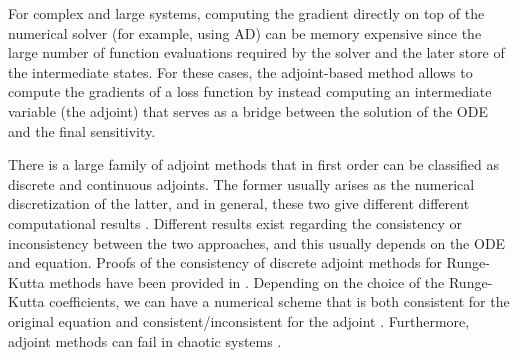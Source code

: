 
For complex and large systems, computing the gradient directly on top of the numerical solver (for example, using AD) can be memory expensive since the large number of function evaluations required by the solver and the later store of the intermediate states. 
For these cases, the adjoint-based method allows to compute the gradients of a loss function by instead computing an intermediate variable (the adjoint) that serves as a bridge between the solution of the ODE and the final sensitivity. 

There is a large family of adjoint methods that in first order can be classified as discrete and continuous adjoints. 
The former usually arises as the numerical discretization of the latter, and in general, these two give different different computational results \cite{Sirkes_Tziperman_1997}.
Different results exist regarding the consistency or inconsistency between the two approaches, and this usually depends on the ODE and equation.  
Proofs of the consistency of discrete adjoint methods for Runge-Kutta methods have been provided in \cite{sandu2006properties, sandu2011solution}.
Depending on the choice of the Runge-Kutta coefficients, we can have a numerical scheme that is both consistent for the original equation and consistent/inconsistent for the adjoint \cite{Hager_2000}.
Furthermore, adjoint methods can fail in chaotic systems \cite{Wang2012-chaos-adjoint}.